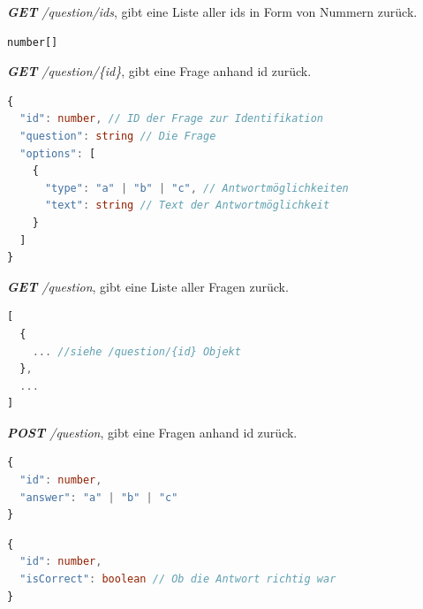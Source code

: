 \documentclass[biblatex]{lni}
\begin{document}
\textit{\textbf{GET} /question/ids}, gibt eine Liste aller ids in Form von Nummern zurück. \\
\begin{lstlisting}[caption={\ac{JSON} der Route \textbf{GET} /type }, label=type, language=typescript]
number[]
\end{lstlisting}

\textit{\textbf{GET} /question/\{id\}}, gibt eine Frage anhand id zurück. \\
\begin{lstlisting}[caption={\ac{JSON} der Route \textbf{GET} /question/\{id\} }, label=get-questionbyid, language=typescript]
{
  "id": number, // ID der Frage zur Identifikation
  "question": string // Die Frage
  "options": [
    {
      "type": "a" | "b" | "c", // Antwortmöglichkeiten
      "text": string // Text der Antwortmöglichkeit
    }
  ]
}
\end{lstlisting}

\textit{\textbf{GET} /question}, gibt eine Liste aller Fragen zurück. \\
\begin{lstlisting}[caption={\ac{JSON} der Route \textbf{GET} /question }, label=get-question, language=typescript]
[
  {
    ... //siehe /question/{id} Objekt
  },
  ...
]
\end{lstlisting}

\textit{\textbf{POST} /question}, gibt eine Fragen anhand id zurück. \\
\begin{lstlisting}[caption={Request \ac{JSON} der Route \textbf{POST} /question }, label=post-question-req, language=typescript]
{
  "id": number,
  "answer": "a" | "b" | "c"
}
\end{lstlisting}
\begin{lstlisting}[caption={Response \ac{JSON} der Route \textbf{POST} /question }, label=post-question-res, language=typescript]
{
  "id": number,
  "isCorrect": boolean // Ob die Antwort richtig war
}
\end{lstlisting}

\newpage
\printbibliography
\end{document}
